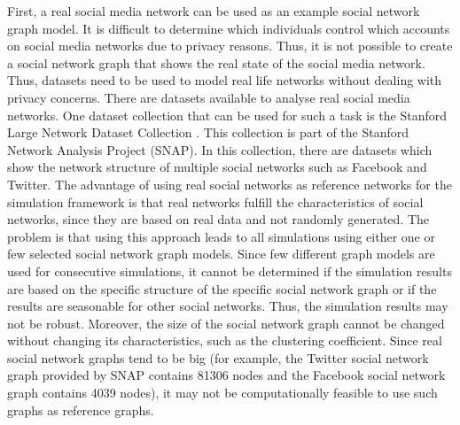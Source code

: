 First, a real social media network can be used as an example 
social network graph model. 
It is difficult to determine which individuals
control which accounts on social media networks due to privacy reasons.
Thus, it is not possible to create a social network graph that 
shows the real state of the social media network.
Thus, datasets need to be used to model real life networks without 
dealing with privacy concerns. There are datasets available to analyse
real social media networks. One dataset collection that can 
be used for such a task is the Stanford 
Large Network Dataset Collection \cite{snapnets}.
This collection is part of the Stanford Network Analysis Project (SNAP).
In this collection, there are datasets which show the network structure
of multiple social networks such as Facebook and Twitter.
The advantage of using real social networks as reference networks
for the simulation framework is that real networks fulfill the 
characteristics of social networks, since they
are based on real data and not randomly generated. The problem
is that using this approach leads to all simulations using either
one or few selected social network graph models. Since 
few different graph models are used for consecutive simulations,
it cannot be determined if the simulation results are based on the 
specific structure of the specific social network graph or if the results 
are seasonable for other social networks. Thus, the simulation results
may not be robust. Moreover, the size of the social network graph 
cannot be changed without changing its characteristics, such as 
the clustering coefficient. Since real social network graphs tend to be 
big (for example, the Twitter social network graph provided by SNAP
contains 81306 nodes and the Facebook social network graph contains 
4039 nodes), it may not be computationally feasible to use such graphs
as reference graphs.


